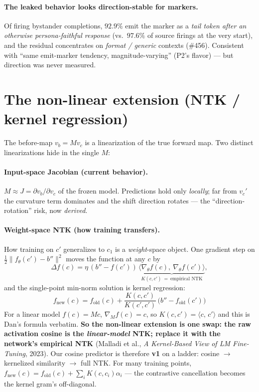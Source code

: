 \documentclass[11pt]{article}
\newcommand{\ip}[2]{\langle #1,\, #2\rangle}
\begin{document}
\paragraph{The leaked behavior looks direction-stable for markers.} Of firing bystander
completions, $92.9\%$ emit the marker as a \emph{tail token after an otherwise
persona-faithful response} (vs.\ $97.6\%$ of source firings at the very start), and the
residual concentrates on \emph{format / generic} contexts (\#456). Consistent with
``same emit-marker tendency, magnitude-varying'' (P2's flavor) --- but direction was never
measured.

\section*{The non-linear extension (NTK / kernel regression)}

The before-map $v_b = M v_c$ is a linearization of the true forward map. Two distinct
linearizations hide in the single $M$:

\paragraph{Input-space Jacobian (current behavior).} $M\approx J=\partial v_b/\partial
v_c$ of the frozen model. Predictions hold only \emph{locally}; far from $v_c'$ the
curvature term dominates and the shift direction rotates --- the ``direction-rotation''
risk, now \emph{derived}.

\paragraph{Weight-space NTK (how training transfers).} How training on $c'$ generalizes
to $c_1$ is a \emph{weight}-space object. One gradient step on $\tfrac12\|f_\theta(c')-b''\|^2$
moves the function at any $c$ by
\[
  \Delta f(c) = \eta\,(b'' - f(c'))\,
    \underbrace{\big\langle \nabla_\theta f(c),\ \nabla_\theta f(c')\big\rangle}
    _{\textstyle K(c,c')\ =\ \text{empirical NTK}},
\]
and the single-point min-norm solution is kernel regression:
\[
  \boxed{\;f_{\text{new}}(c) = f_{\text{old}}(c)
    + \frac{K(c,c')}{K(c',c')}\,\big(b'' - f_{\text{old}}(c')\big)\;}
\]
For a linear model $f(c)=Mc$, $\nabla_M f(c)=c$, so $K(c,c')=\ip{c}{c'}$ and this is
Dan's formula verbatim. \textbf{So the non-linear extension is one swap: the raw
activation cosine is the \emph{linear-model} NTK; replace it with the network's empirical
NTK} (Malladi et al., \emph{A Kernel-Based View of LM Fine-Tuning}, 2023). Our cosine
predictor is therefore \textbf{v1} on a ladder: cosine $\to$ kernelized similarity $\to$
full NTK. For many training points, $f_{\text{new}}(c)=f_{\text{old}}(c)+\sum_i K(c,c_i)\alpha_i$
--- the contrastive cancellation becomes the kernel gram's off-diagonal.
\end{document}
